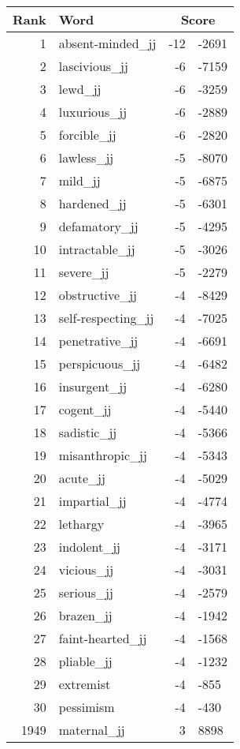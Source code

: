 \begin{longtable}[!htbp]{| rlr@{.}l |}
    \hline
    \textbf{Rank} & \textbf{Word} & \multicolumn{2}{c|}{\textbf{Score}} \\
    \hline
    \endhead
    1 & absent-minded\_jj & -12 & -2691 \\
    2 & lascivious\_jj & -6 & -7159 \\
    3 & lewd\_jj & -6 & -3259 \\
    4 & luxurious\_jj & -6 & -2889 \\
    5 & forcible\_jj & -6 & -2820 \\
    6 & lawless\_jj & -5 & -8070 \\
    7 & mild\_jj & -5 & -6875 \\
    8 & hardened\_jj & -5 & -6301 \\
    9 & defamatory\_jj & -5 & -4295 \\
    10 & intractable\_jj & -5 & -3026 \\
    11 & severe\_jj & -5 & -2279 \\
    12 & obstructive\_jj & -4 & -8429 \\
    13 & self-respecting\_jj & -4 & -7025 \\
    14 & penetrative\_jj & -4 & -6691 \\
    15 & perspicuous\_jj & -4 & -6482 \\
    16 & insurgent\_jj & -4 & -6280 \\
    17 & cogent\_jj & -4 & -5440 \\
    18 & sadistic\_jj & -4 & -5366 \\
    19 & misanthropic\_jj & -4 & -5343 \\
    20 & acute\_jj & -4 & -5029 \\
    21 & impartial\_jj & -4 & -4774 \\
    22 & lethargy & -4 & -3965 \\
    23 & indolent\_jj & -4 & -3171 \\
    24 & vicious\_jj & -4 & -3031 \\
    25 & serious\_jj & -4 & -2579 \\
    26 & brazen\_jj & -4 & -1942 \\
    27 & faint-hearted\_jj & -4 & -1568 \\
    28 & pliable\_jj & -4 & -1232 \\
    29 & extremist & -4 & -855 \\
    30 & pessimism & -4 & -430 \\
    1949 & maternal\_jj & 3 & 8898 \\

\end{longtable}
